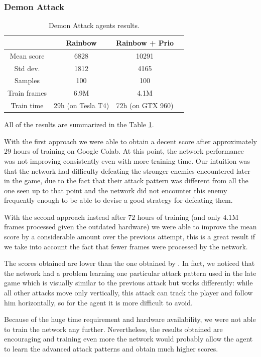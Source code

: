 \documentclass[10pt,twocolumn,letterpaper]{article}
\begin{document}
\subsubsection{Demon Attack}

\begin{table}
	\begin{center}
		\begin{tabular}{ |c|c|c|c| } 
			\hline
			& Rainbow & Rainbow + Prio \\ 
			\hline
			Mean score & 6828 & 10291\\
			Std dev. & 1812 & 4165\\
			Samples & 100 & 100\\
			Train frames & 6.9M & 4.1M\\
			Train time & 29h (on Tesla T4) & 72h (on GTX 960)\\
			\hline
		\end{tabular}
	\end{center}
	\caption{Demon Attack agents results.}
	\label{tab:da_result}
\end{table}
All of the results are summarized in the Table \ref{tab:da_result}.

With the first approach we were able to obtain a decent score after approximately $29$ hours of training on Google Colab. At this point, the network performance was not improving consistently even with more training time. Our intuition was that the network had difficulty defeating the stronger enemies encountered later in the game, due to the fact that their attack pattern was different from all the one seen up to that point and the network did not encounter this enemy frequently enough to be able to devise a good strategy for defeating them.

With the second approach instead after $72$ hours of training (and only $4.1$M frames processed given the outdated hardware) we were able to improve the mean score by a considerable amount over the previous attempt, this is a great result if we take into account the fact that fewer frames were processed by the network.

The scores obtained are lower than the one obtained by \cite{DBLP:journals/corr/abs-1710-02298}. In fact, we noticed that the network had a problem learning one particular attack pattern used in the late game which is visually similar to the previous attack but works differently: while all other attacks move only vertically, this attack can track the player and follow him horizontally, so for the agent it is more difficult to avoid.

Because of the huge time requirement and hardware availability, we were not able to train the network any further. Nevertheless, the results obtained are encouraging and training even more the network would probably allow the agent to learn the advanced attack patterns and obtain much higher scores.

{\small


}
\end{document}
